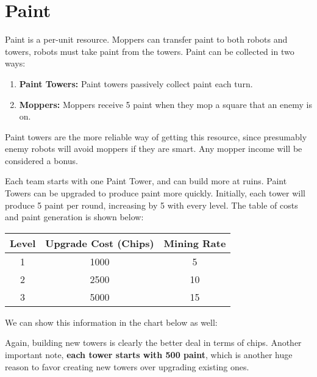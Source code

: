 \documentclass{article}
\begin{document}
  \section*{Paint}

  Paint is a per-unit resource. Moppers can transfer paint to both robots and towers, robots must take paint from the towers. Paint can be collected in two ways:
  \begin{enumerate}
    \item \textbf{Paint Towers:} Paint towers passively collect paint each turn.
    \item \textbf{Moppers:} Moppers receive 5 paint when they mop a square that an enemy is on.
  \end{enumerate}
  Paint towers are the more reliable way of getting this resource, since presumably enemy robots will avoid moppers if they are smart. Any mopper income will be considered a bonus.

  \medskip

  Each team starts with one Paint Tower, and can build more at ruins. Paint Towers can be upgraded to produce paint more quickly. Initially, each tower will produce 5 paint per round, increasing by 5 with every level. The table of costs and paint generation is shown below:
  \begin{center}
    \begin{tabular}{c | c | c}
      Level & Upgrade Cost (Chips) & Mining Rate \\
      \hline 
      1 & 1000 & 5    \\
      2 & 2500 & 10   \\
      3 & 5000 & 15   \\
    \end{tabular}
  \end{center}
  We can show this information in the chart below as well:
  \begin{center}
  \end{center}
  Again, building new towers is clearly the better deal in terms of chips. Another important note, \textbf{each tower starts with 500 paint}, which is another huge reason to favor creating new towers over upgrading existing ones.
\end{document}
